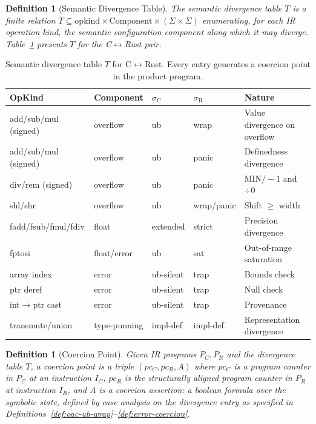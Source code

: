\documentclass[11pt]{article}
\newtheorem{definition}[theorem]{Definition}
\newcommand{\SemConfigC}{\sigma_{\mathrm{C}}}
\newcommand{\SemConfigR}{\sigma_{\mathrm{R}}}
\newcommand{\opkind}{\mathrm{opkind}}
\begin{document}
\begin{definition}[Semantic Divergence Table]
\label{def:divtable}
The \emph{semantic divergence table} $T$ is a finite relation $T \subseteq \opkind \times \mathrm{Component} \times (\Sigma \times \Sigma)$ enumerating, for each IR operation kind, the semantic configuration component along which it may diverge. Table~\ref{tab:divergence} presents $T$ for the C$\leftrightarrow$Rust pair.
\end{definition}

\begin{table}[t]
\centering
\caption{Semantic divergence table $T$ for C$\leftrightarrow$Rust. Every entry generates a coercion point in the product program.}
\label{tab:divergence}
\begin{tabular}{@{}llllp{4cm}@{}}
\toprule
OpKind & Component & $\SemConfigC$ & $\SemConfigR$ & Nature \\
\midrule
add/sub/mul (signed) & overflow & ub & wrap & Value divergence on overflow \\
add/sub/mul (signed) & overflow & ub & panic & Definedness divergence \\
div/rem (signed) & overflow & ub & panic & $\mathrm{MIN}/-1$ and $\div 0$ \\
shl/shr & overflow & ub & wrap/panic & Shift $\geq$ width \\
fadd/fsub/fmul/fdiv & float & extended & strict & Precision divergence \\
fptosi & float/error & ub & sat & Out-of-range saturation \\
array index & error & ub-silent & trap & Bounds check \\
ptr deref & error & ub-silent & trap & Null check \\
int$\to$ptr cast & error & ub-silent & trap & Provenance \\
transmute/union & type-punning & impl-def & impl-def & Representation divergence \\
\bottomrule
\end{tabular}
\end{table}

\begin{definition}[Coercion Point]
\label{def:coercion-point}
Given IR programs $P_C, P_R$ and the divergence table $T$, a \emph{coercion point} is a triple $(pc_C, pc_R, A)$ where $pc_C$ is a program counter in $P_C$ at an instruction $I_C$, $pc_R$ is the structurally aligned program counter in $P_R$ at instruction $I_R$, and $A$ is a \emph{coercion assertion}: a boolean formula over the symbolic state, defined by case analysis on the divergence entry as specified in Definitions~\ref{def:oac-ub-wrap}--\ref{def:error-coercion}.
\end{definition}
\end{document}

